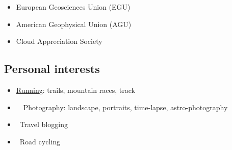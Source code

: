 \documentclass[11pt,a4paper,svgnames]{article}
\begin{document}
\begin{itemize}
\item European Geosciences Union (EGU)
\item American Geophysical Union (AGU)
\item Cloud Appreciation Society
\end{itemize}

\subsection{Personal interests}

\begin{itemize}
\item \href{http://www.wikiloc.com/wikiloc/user.do?id=458033}{Running}: trails, mountain races, track
\item \href{https://500px.com/charlestroupin}{\faicon{500px}}~\href{https://www.flickr.com/photos/sharlo1982/}{\faFlickr}~{Photography: landscape, portraits, time-lapse, astro-photography}
\item \faWordpress~Travel blogging
\item \faBicycle~Road cycling
\end{itemize}
\end{document}
